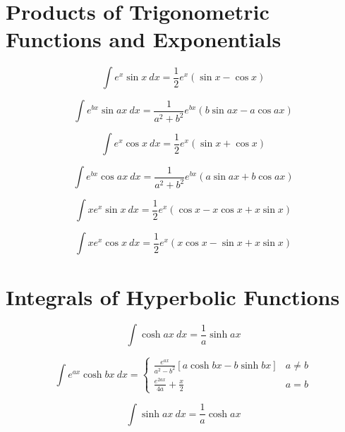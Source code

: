 \documentclass[12pt,letterpaper,leqno]{article}
\begin{document}
\section*{Products of Trigonometric Functions and Exponentials}

\begin{equation}
\int e^x \sin x \ dx = \frac{1}{2}e^x (\sin x - \cos x) 
\end{equation}

\begin{equation}\label{eq:ritzert}
\int e^{bx} \sin ax\ dx = \frac{1}{a^2+b^2}e^{bx} (b\sin ax - a\cos ax) 
\end{equation}

\begin{equation}
\int e^x \cos x\ dx = \frac{1}{2}e^x (\sin x + \cos x)  
\end{equation}

\begin{equation}
\int e^{bx} \cos ax\ dx = \frac{1}{a^2 + b^2} e^{bx} ( a \sin ax + b \cos ax ) 
\end{equation}

\begin{equation}
\int x e^x \sin x\ dx = \frac{1}{2}e^x (\cos x - x \cos x + x \sin x) 
\end{equation}

\begin{equation}
\int x e^x \cos x\ dx = \frac{1}{2}e^x (x \cos x 
- \sin x + x \sin x) 
\end{equation}

 \section*{Integrals of Hyperbolic Functions}

\begin{equation}
\int \cosh ax\ dx =\frac{1}{a} \sinh ax 
\end{equation}

\begin{equation}
\int e^{ax}  \cosh bx \ dx = 
\begin{cases}
\displaystyle{\frac{e^{ax}}{a^2-b^2} }[ a \cosh bx - b \sinh bx ]  & a\ne b \\
\displaystyle{\frac{e^{2ax}}{4a} + \frac{x}{2}}  & a = b
\end{cases}
\end{equation}

\begin{equation}
\int \sinh ax\ dx = \frac{1}{a} \cosh ax 
\end{equation}
\end{document}

